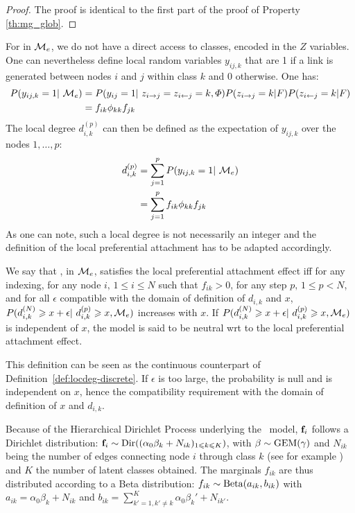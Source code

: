 \begin{proof}
The proof is identical to the first part of the proof of Property \ref{th:mg_glob}.
\end{proof}

\vspace{0.1cm}
For \textbf{\imb} in $\mathcal{M}_e$, we do not have a direct access to classes, encoded in the $Z$ variables. One can nevertheless define  local random variables $y_{ij,k}$ that are 1 if a link is generated between nodes $i$ and $j$ within class $k$ and 0 otherwise. One has:
%
\begin{align*}
P(y_{ij,k}=1 | \M_e) &= P(y_{ij}=1 | z_{i\rightarrow j} = z_{i\leftarrow j}=k, \Phi) P(z_{i\rightarrow j}=k|F)P(z_{i\leftarrow j}=k|F) \\
    &= f_{ik} \phi_{kk} f_{jk}
\end{align*}
%
The local degree $d_{i,k}^{(p)}$ can then be defined as the expectation of $y_{ij,k}$ over the nodes $1,\dotsc,p$:
%
\begin{align}\label{def:locdegimb}
d_{i,k}^{(p)} &= \sum_{j=1}^p P(y_{ij,k}=1 | \M_e)  \nonumber \\
    &= \sum_{j=1}^p f_{ik} \phi_{kk} f_{jk}
\end{align}
%
As one can note, such a local degree is not necessarily an integer and the definition of the local preferential attachment has to be adapted accordingly. 
%
\begin{definition}
We say that \imb, in $\mathcal{M}_e$, satisfies the local preferential attachment effect iff for any indexing, for any node $i, \, 1\leq i \leq N$ such that $f_{ik}>0$, for any step $p, \, 1\leq p < N$, and  for all $\epsilon$ compatible with the domain of definition of $d_{i,k}$ and $x$, $P(d_{i,k}^{(N)} \geq x+\epsilon | d_{i,k}^{(p)} \geq x,\M_e)$ increases with $x$. If $P(d_{i,k}^{(N)} \geq x+\epsilon | d_{i,k}^{(p)} \geq x,\M_e)$ is independent of $x$, the model is said to be neutral wrt to the local preferential attachment effect.
\end{definition}

This definition can be seen as the continuous counterpart of Definition~\ref{def:locdeg-discrete}. If $\epsilon$ is too large, the probability is null and is independent on $x$, hence the compatibility requirement with the domain of definition of $x$ and $d_{i,k}$. 

Because of the Hierarchical Dirichlet Process underlying the \imb\ model, $\mathbf{f}_i$ follows a Dirichlet distribution: $\mathbf{f}_i \sim \mathrm{Dir}((\alpha_0 \beta_k + N_{ik})_{1 \leqslant k \leqslant K})$, with $\mathbf{\beta}\sim \mathrm{GEM}(\gamma)$ and $N_{ik}$ being the number of edges connecting node $i$ through class $k$ (see for example \cite{teh2006hierarchical}) and $K$ the number of latent classes obtained. The marginals $f_{ik}$ are thus distributed according to a Beta distribution: $f_{ik} \sim \mathrm{Beta}(a_{ik}, b_{ik})$ with $a_{ik} = \alpha_0\beta_k + N_{ik}$ and $b_{ik} = \sum_{k'=1, k' \ne k}^{K} \alpha_0\beta_k' + N_{ik'}$.

